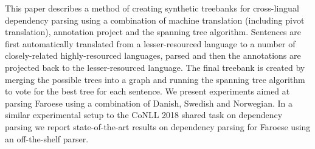 This paper describes a method of creating synthetic treebanks for cross-lingual dependency parsing using a combination of machine translation (including pivot translation), annotation project and the spanning tree algorithm. Sentences are first automatically translated from a lesser-resourced language to a number of closely-related highly-resourced languages, parsed and then the annotations are projected back to the lesser-resourced language. The final treebank is created by merging the possible trees into a graph and running the spanning tree algorithm to vote for the best tree for each sentence. We present experiments aimed at parsing Faroese using a combination of Danish, Swedish and Norwegian. In a similar experimental setup to the CoNLL 2018 shared task on dependency parsing we report state-of-the-art results on dependency parsing for Faroese using an off-the-shelf parser.

